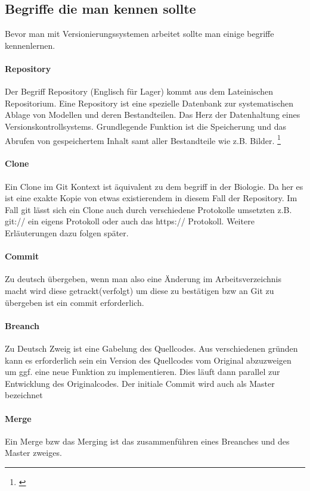 \documentclass[12pt,a4paper,bibliography=totocnumbered,listof=totocnumbered]{scrartcl}
\begin{document}
\subsection{Begriffe die man kennen sollte}
Bevor man mit Versionierungssystemen arbeitet sollte man einige begriffe kennenlernen. 
\paragraph{Repository}
Der Begriff Repository (Englisch für Lager) kommt aus dem Lateinischen Repositorium.
Eine Repository ist eine spezielle Datenbank zur systematischen Ablage von Modellen und deren Bestandteilen. Das Herz der Datenhaltung eines Versionskontrollsystems. Grundlegende Funktion ist die Speicherung und das Abrufen von gespeichertem Inhalt samt aller Bestandteile wie z.B. Bilder. \footnote{\cite{Leymann}} 

\paragraph{Clone}
Ein Clone im Git Kontext ist äquivalent zu dem begriff in der Biologie. Da her es ist eine exakte Kopie von etwas existierendem in diesem Fall der Repository. Im Fall git lässt sich  ein Clone auch durch verschiedene Protokolle umsetzten z.B. git:// ein eigens Protokoll oder auch das https:// Protokoll. Weitere Erläuterungen dazu folgen später. 
\paragraph{Commit}
Zu deutsch übergeben, wenn man also eine Änderung im Arbeitsverzeichnis macht wird diese getrackt(verfolgt) um diese zu bestätigen bzw an Git zu übergeben ist ein commit erforderlich. 
\paragraph{Breanch}
Zu Deutsch Zweig ist eine Gabelung des Quellcodes. Aus verschiedenen gründen kann es erforderlich sein ein Version des Quellcodes vom Original abzuzweigen um ggf. eine neue Funktion zu implementieren. Dies läuft dann parallel zur Entwicklung des Originalcodes. Der initiale Commit wird auch als Master bezeichnet 
\paragraph{Merge}
Ein Merge bzw das Merging ist das zusammenführen eines Breanches und des Master zweiges. 
\end{document}
